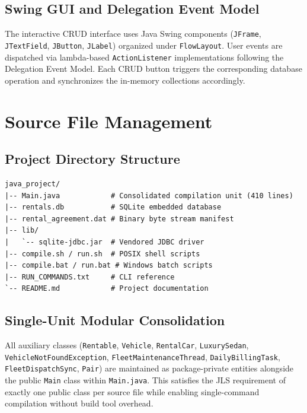 \documentclass[11pt,a4paper]{article}
\begin{document}
\subsection{Swing GUI and Delegation Event Model}
The interactive CRUD interface uses Java Swing components (\texttt{JFrame}, \texttt{JTextField}, \texttt{JButton}, \texttt{JLabel}) organized under \texttt{FlowLayout}. User events are dispatched via lambda-based \texttt{ActionListener} implementations following the Delegation Event Model. Each CRUD button triggers the corresponding database operation and synchronizes the in-memory collections accordingly.

\newpage
\section{Source File Management}
\label{sec:source}

\subsection{Project Directory Structure}
\begin{lstlisting}[language={}, caption={Project Directory Layout}]
java_project/
|-- Main.java            # Consolidated compilation unit (410 lines)
|-- rentals.db           # SQLite embedded database
|-- rental_agreement.dat # Binary byte stream manifest
|-- lib/
|   `-- sqlite-jdbc.jar  # Vendored JDBC driver
|-- compile.sh / run.sh  # POSIX shell scripts
|-- compile.bat / run.bat # Windows batch scripts
|-- RUN_COMMANDS.txt     # CLI reference
`-- README.md            # Project documentation
\end{lstlisting}

\subsection{Single-Unit Modular Consolidation}
All auxiliary classes (\texttt{Rentable}, \texttt{Vehicle}, \texttt{RentalCar}, \texttt{LuxurySedan}, \texttt{VehicleNotFoundException}, \texttt{FleetMaintenanceThread}, \texttt{DailyBillingTask}, \texttt{FleetDispatchSync}, \texttt{Pair}) are maintained as package-private entities alongside the public \texttt{Main} class within \texttt{Main.java}. This satisfies the JLS requirement of exactly one public class per source file while enabling single-command compilation without build tool overhead.
\end{document}
